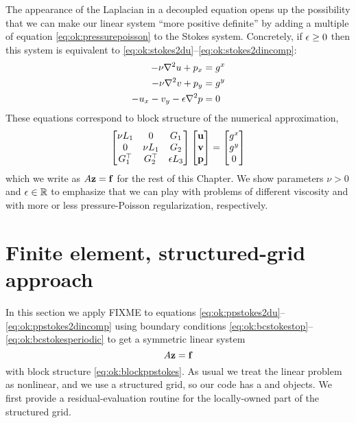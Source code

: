 The appearance of the Laplacian in a decoupled equation opens up the possibility that we can make our linear system ``more positive definite'' by adding a multiple of equation \eqref{eq:ok:pressurepoisson} to the Stokes system.  Concretely, if $\epsilon\ge 0$ then this system is equivalent to \eqref{eq:ok:stokes2du}--\eqref{eq:ok:stokes2dincomp}:
\begin{align}
-\nu \nabla^2 u + p_x &= g^x \label{eq:ok:ppstokes2du} \\
-\nu \nabla^2 v + p_y &= g^y \label{eq:ok:ppstokes2dv} \\
- u_x - v_y - \epsilon \nabla^2 p &= 0 \label{eq:ok:ppstokes2dincomp}
\end{align}
These equations correspond to block structure of the numerical approximation,
\begin{equation}
\begin{bmatrix}
    \nu L_1 & 0 & G_1 \\
    0 & \nu L_1 & G_2 \\
    G_1^\top & G_2^\top & \epsilon L_3
    \end{bmatrix}
    \begin{bmatrix}
    \mathbf{u} \\ \mathbf{v} \\ \mathbf{p}
    \end{bmatrix}
    =
    \begin{bmatrix}
    g^x \\ g^y \\ 0
    \end{bmatrix} \label{eq:ok:blockppstokes}
\end{equation}
which we write as $A\mathbf{z} = \mathbf{f}$ for the rest of this Chapter.  We show parameters $\nu>0$ and $\epsilon \in \mathbb{R}$ to emphasize that we can play with problems of different viscosity and with more or less pressure-Poisson regularization, respectively. 


\section{Finite element, structured-grid approach}

In this section we apply FIXME to equations \eqref{eq:ok:ppstokes2du}--\eqref{eq:ok:ppstokes2dincomp} using boundary conditions \eqref{eq:ok:bcstokestop}--\eqref{eq:ok:bcstokesperiodic} to get a symmetric linear system
\begin{equation}
  A \mathbf{z} = \mathbf{f} \label{eq:ok:linsysstokes}
\end{equation}
with block structure \eqref{eq:ok:blockppstokes}.  As usual we treat the linear problem as nonlinear, and we use a structured grid, so our code has a \pSNES and \pDMDA objects.  We first provide a residual-evaluation routine for the locally-owned part of the structured grid.

